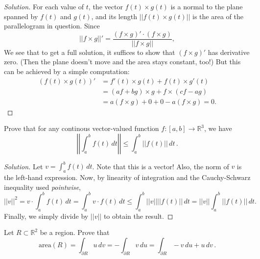 \documentclass[Shifrin_Solutions_Spring_2018]{subfiles}
\begin{document}
\begin{proof}[Solution]
For each value of $t$, the vector $f(t) \times g(t)$ is a normal to the plane spanned by $f(t)$ and $g(t)$, and its length $||f(t) \times g(t)||$ is the area of the parallelogram in question. Since
\[
||f \times g||' = \dfrac{(f\times g)' \cdot (f\times g)}{||f\times g||} ,
\]
We see that to get a full solution, it suffices to show that $(f\times g)'$ has derivative zero. (Then the plane doesn't move and the area stays constant, too!) But this can be achieved by a simple computation:
\[
\begin{split}
(f(t)\times g(t) )' & = f'(t) \times g(t) + f(t) \times g'(t) \\
& = (af + bg ) \times g + f \times (c f - a g) \\
& = a ( f\times g) + 0 + 0 - a ( f\times g) = 0.
\end{split}
\]

\end{proof}


\vspace{1cm}


\begin{exercise}
Prove that for any continous vector-valued function $f:[a,b]\rightarrow \mathbb{R}^3$, we have
\[
\left|\left| \int_a^b f(t) \, dt \right| \right| \leq \int_a^b ||f(t)||\, dt\, .
\]
\end{exercise}

\begin{proof}[Solution]
Let $v = \int_a^b f(t)\, dt$. Note that this is a vector! Also, the norm of $v$ is the left-hand expression. Now, by linearity of integration and the Cauchy-Schwarz inequality used \emph{pointwise},
\[
||v||^2 = v \cdot \int_a^b f(t)\, dt = \int_a^b v\cdot f(t) \, dt \leq \int_a^b ||v|| ||f(t)|| \, dt = ||v|| \int_a^b ||f(t)|| \, dt .
\]
Finally, we simply divide by $||v||$ to obtain the result.

\end{proof}

\vspace{1cm}

\begin{exercise} Let $R\subset \mathbb{R}^2$ be a region. Prove that
\[
\text{area}(R) = \int_{\partial R} u\, dv = -\int_{\partial R} v\, du = \int_{\partial R} -v\, du + u\, dv\, .
\]
\end{exercise}
\end{document}
